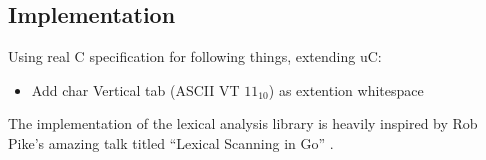 \subsection{Implementation}


Using real C specification for following things, extending uC:
\begin{itemize}
	\item Add char Vertical tab (ASCII VT $11_{10}$) as extention whitespace
\end{itemize}

The implementation of the lexical analysis library is heavily inspired by Rob Pike's amazing talk titled ``Lexical Scanning in Go'' \cite{lexical_scanning_in_go}.
